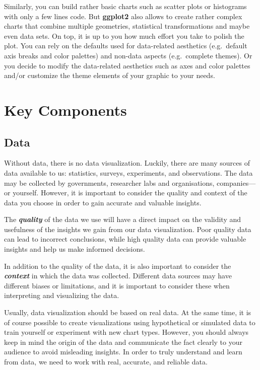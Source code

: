 \documentclass[
]{krantz}
\begin{document}
Similarly, you can build rather basic charts such as scatter plots or histograms with only a few lines code. But \textbf{ggplot2} also allows to create rather complex charts that combine multiple geometries, statistical transformations and maybe even data sets. On top, it is up to you how much effort you take to polish the plot. You can rely on the defaults used for data-related aesthetics (e.g.~default axis breaks and color palettes) and non-data aspects (e.g.~complete themes). Or you decide to modify the data-related aesthetics such as axes and color palettes and/or customize the theme elements of your graphic to your needs.

\hypertarget{key-components}{%
\section{Key Components}\label{key-components}}

\hypertarget{data}{%
\subsection{Data}\label{data}}

Without data, there is no data visualization. Luckily, there are many sources of data available to us: statistics, surveys, experiments, and observations. The data may be collected by governments, researcher labs and organisations, companies---or yourself. However, it is important to consider the quality and context of the data you choose in order to gain accurate and valuable insights.

The \textbf{\emph{quality}} of the data we use will have a direct impact on the validity and usefulness of the insights we gain from our data visualization. Poor quality data can lead to incorrect conclusions, while high quality data can provide valuable insights and help us make informed decisions.

In addition to the quality of the data, it is also important to consider the \textbf{\emph{context}} in which the data was collected. Different data sources may have different biases or limitations, and it is important to consider these when interpreting and visualizing the data.

Usually, data visualization should be based on real data. At the same time, it is of course possible to create visualizations using hypothetical or simulated data to train yourself or experiment with new chart types. However, you should always keep in mind the origin of the data and communicate the fact clearly to your audience to avoid misleading insights. In order to truly understand and learn from data, we need to work with real, accurate, and reliable data.
\end{document}
